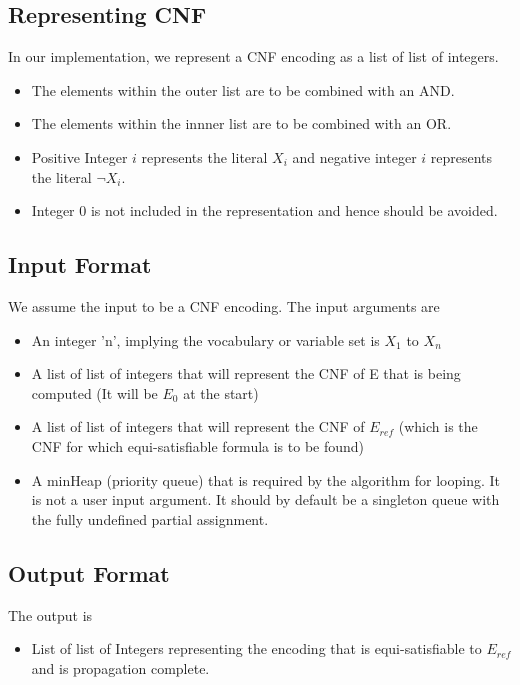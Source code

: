 \documentclass{article}
\theoremstyle{plain}
\begin{document}
\subsection{Representing CNF}
In our implementation, we represent a CNF encoding as a list of list of integers.
\begin{itemize}
\item The elements within the outer list are to be combined with an AND.
\item The elements within the innner list are to be combined with an OR.
\item Positive Integer $i$ represents the literal $X_i$ and negative integer $i$ represents the literal $\neg X_i$. 
\item Integer $0$ is not included in the representation and hence should be avoided.
\end{itemize}
\subsection{Input Format}
We assume the input to be a CNF encoding. The input arguments are 
\begin{itemize}
\item An integer 'n', implying the vocabulary or variable set is $X_1$ to $X_n$
\item A list of list of integers that will represent the CNF of E that is being computed (It will be $E_0$ at the start)
\item A list of list of integers that will represent the CNF of $E_{ref}$ (which is the CNF for which equi-satisfiable formula is to be found)
\item A minHeap (priority queue) that is required by the algorithm for looping. It is not a user input argument. It should by default be a singleton queue with the fully undefined partial assignment.
\end{itemize}
\subsection{Output Format}
The output is 
\begin{itemize}
\item List of list of Integers representing the encoding that is equi-satisfiable to $E_{ref}$ and is propagation complete.
\end{itemize}
\end{document}
